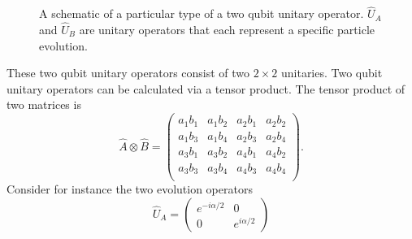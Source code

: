 \documentclass[twocolumn]{article}
\begin{document}
\begin{figure}[ht]
    \caption{\footnotesize{A schematic of a particular type of a two qubit unitary operator. $\hat{U}_A$ and $\hat{U}_B$ are unitary operators that each represent a specific particle evolution.}}
    \label{Fig: TQ}
\end{figure}
\par \noindent
These two qubit unitary operators consist of two $2\times2$ unitaries. Two qubit unitary operators can be calculated via a tensor product. The tensor product of two matrices is
\begin{equation} \label{Eq: TPM}
\hat{A}\otimes\hat{B}=
\left(\begin{array}{cccc}
a_1b_1 & a_1b_2 & a_2b_1 & a_2b_2 \\
a_1b_3 & a_1b_4 & a_2b_3 & a_2b_4 \\
a_3b_1 & a_3b_2 & a_4b_1 & a_4b_2 \\
a_3b_3 & a_3b_4 & a_4b_3 & a_4b_4 \\
\end{array}\right).
\end{equation}
Consider for instance the two evolution operators
\begin{equation} \label{Eq: EO}
\hat{U}_A=
\begin{pmatrix}
e^{-i\alpha/2} & 0 \\
0 & e^{i\alpha/2}
\end{pmatrix}
\end{equation}
\end{document}
